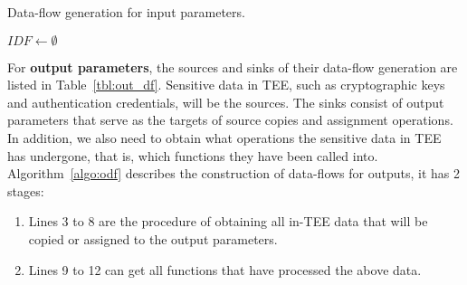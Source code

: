 \begin{algorithm}[t]
\caption{Data-flow generation for input parameters.}
\label{algo:idf}
$IDF \gets \emptyset$\;
\end{algorithm}

For \textbf{output parameters}, the sources and sinks of their data-flow generation are listed in Table~\ref{tbl:out_df}. Sensitive data in TEE, such as cryptographic keys and authentication credentials, will be the sources. The sinks consist of output parameters that serve as the targets of source copies and assignment operations. In addition, we also need to obtain what operations the sensitive data in TEE has undergone, that is, which functions they have been called into.
Algorithm~\ref{algo:odf} describes the construction of data-flows for outputs, it has 2 stages: 

\begin{enumerate}[label=\alph*)]
    \item Lines 3 to 8 are the procedure of obtaining all in-TEE data that will be copied or assigned to the output parameters.
    \item Lines 9 to 12 can get all functions that have processed the above data.
\end{enumerate}

